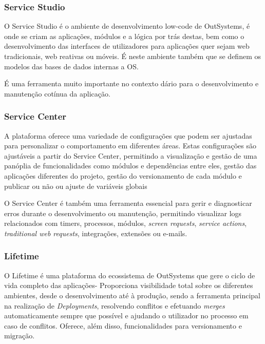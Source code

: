 \subsubsection{Service Studio}

    O Service Studio é o ambiente de desenvolvimento low-code de OutSystems, é onde se criam as aplicações, módulos e a lógica por trás destas, bem como o desenvolvimento das interfaces de utilizadores para aplicações quer sejam web tradicionais, web reativas ou móveis. 
    É neste ambiente também que se definem os modelos das bases de dados internas a OS. 
    
    É uma ferramenta muito importante no contexto dário para o desenvolvimento e manutenção cotínua da aplicação.

\subsubsection{Service Center}

    A plataforma oferece uma variedade de configurações que podem ser ajustadas para personalizar o comportamento em diferentes áreas. Estas configurações são ajustáveis a partir do Service Center, permitindo a visualização e gestão de uma panóplia de funcionalidades como módulos e dependências entre eles, gestão das aplicações diferentes do projeto, gestão do versionamento de cada módulo e publicar ou não ou ajuste de variáveis globais
    
    O Service Center é também uma ferramenta essencial para gerir e diagnosticar erros durante o desenvolvimento ou manutenção, permitindo visualizar logs relacionados com timers, processos, módulos, \textit{screen requests}, \textit{service actions}, \textit{traditional web requests}, integrações, extensões ou e-mails.

\subsubsection{Lifetime}

    O Lifetime é uma plataforma do ecossistema de OutSystems que gere o ciclo de vida completo das aplicações- Proporciona visibilidade total sobre os diferentes ambientes, desde o desenvolvimento até à produção, sendo a ferramenta principal na realização de \textit{Deployments}, resolvendo conflitos e efetuando \textit{merges} automaticamente sempre que possível e ajudando o utilizador no processo em caso de conflitos. Oferece, além disso, funcionalidades para versionamento e migração.